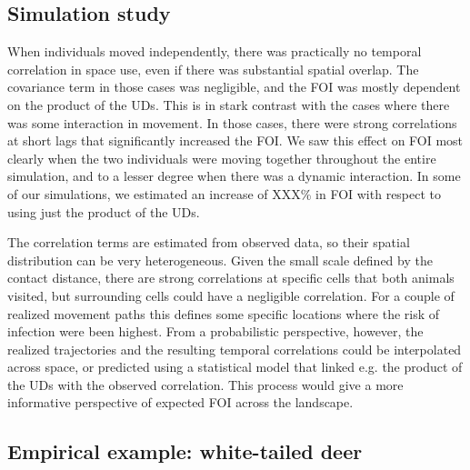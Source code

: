\documentclass[letterpaper]{article}
\begin{document}
\subsection*{Simulation study}

When individuals moved independently, there was practically no temporal correlation in space use, even if there was substantial spatial overlap. The covariance term in those cases was negligible, and the FOI was mostly dependent on the product of the UDs.
This is in stark contrast with the cases where there was some interaction in movement. 
In those cases, there were strong correlations at short lags that significantly increased the FOI. 
We saw this effect on FOI most clearly when the two individuals were moving together throughout the entire simulation, and to a lesser degree when there was a dynamic interaction.
In some of our simulations, we estimated an increase of XXX\% in FOI with respect to using just the product of the UDs.

The correlation terms are estimated from observed data, so their spatial distribution can be very heterogeneous. Given the small scale defined by the contact distance, there are strong correlations at  specific cells that both animals visited, but surrounding cells could have a negligible correlation. 
For a couple of realized movement paths this defines some specific locations where the risk of infection were been highest. From a probabilistic perspective, however, the realized trajectories and the resulting temporal correlations could be interpolated across space, or predicted using a statistical model that linked e.g. the product of the UDs with the observed correlation. This process would give a more informative perspective of expected FOI across the landscape. 



\subsection*{Empirical example: white-tailed deer}

 
\end{document}
